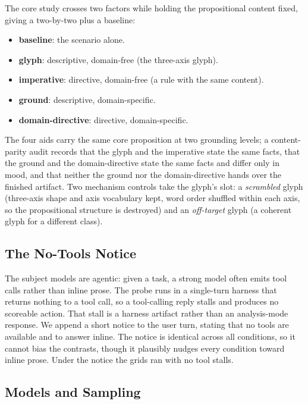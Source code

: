 \documentclass[11pt,a4paper]{article}
\begin{document}
The core study crosses two factors while holding the propositional content fixed,
giving a two-by-two plus a baseline:

\begin{itemize}
  \item \textbf{baseline}: the scenario alone.
  \item \textbf{glyph}: descriptive, domain-free (the three-axis glyph).
  \item \textbf{imperative}: directive, domain-free (a rule with the same content).
  \item \textbf{ground}: descriptive, domain-specific.
  \item \textbf{domain-directive}: directive, domain-specific.
\end{itemize}

The four aids carry the same core proposition at two grounding levels; a
content-parity audit records that the glyph and the imperative state the same facts,
that the ground and the domain-directive state the same facts and differ only in
mood, and that neither the ground nor the domain-directive hands over the finished
artifact. Two mechanism controls take the glyph's slot: a \emph{scrambled} glyph
(three-axis shape and axis vocabulary kept, word order shuffled within each axis, so the
propositional structure is destroyed) and an \emph{off-target}
glyph (a coherent glyph for a different class).

\subsection{The No-Tools Notice}\label{sec:notice}

The subject models are agentic: given a task, a strong model often emits tool calls
rather than inline prose. The probe runs in a single-turn harness that returns
nothing to a tool call, so a tool-calling reply stalls and produces no scoreable
action. That stall is a harness artifact rather than an analysis-mode response. We
append a short notice to the user turn, stating that no tools are available and to
answer inline. The notice is identical across all conditions, so it cannot bias the
contrasts, though it plausibly nudges every condition toward inline prose. Under the
notice the grids ran with no tool stalls.

\subsection{Models and Sampling}\label{sec:sampling}
\end{document}
